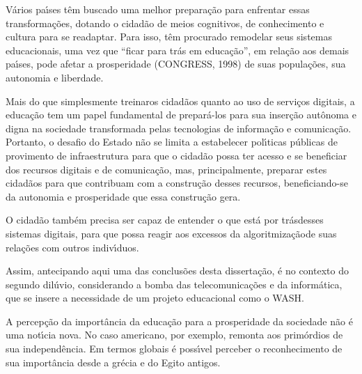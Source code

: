 \documentclass[
12pt,		%
openright,	%
twoside,  %
a4paper,			%
chapter=TITLE,		%
english,			%
french,				%
spanish,			%
brazil				%
]{USPSC-classe/USPSC}
\begin{document}
V\'arios pa\'{\i}ses t\^em buscado uma melhor prepara\c{c}\~ao para enfrentar essas transforma\c{c}\~oes, dotando o cidad\~ao de meios cognitivos, de conhecimento e cultura para se readaptar. Para isso, t\^em procurado remodelar seus sistemas educacionais, uma vez que “ficar para tr\'as em educa\c{c}\~ao”, em rela\c{c}\~ao aos demais pa\'{\i}ses, pode afetar a prosperidade (CONGRESS, 1998)  de suas popula\c{c}\~oes, sua autonomia e liberdade.




Mais do que simplesmente \textquotedbl treinar\textquotedbl  os cidad\~aos quanto ao uso  de servi\c{c}os digitais, a educa\c{c}\~ao tem um papel fundamental de prepar\'a-los para sua inser\c{c}\~ao aut\^onoma e digna na sociedade transformada pelas tecnologias de informa\c{c}\~ao e comunica\c{c}\~ao. Portanto, o desafio do Estado n\~ao se limita a estabelecer pol\'{\i}ticas p\'ublicas de provimento de infraestrutura para que o cidad\~ao possa ter acesso e se beneficiar dos recursos digitais e de comunica\c{c}\~ao, mas, principalmente, preparar estes cidad\~aos para que contribuam com a  constru\c{c}\~ao desses recursos, beneficiando-se da autonomia e prosperidade que  essa constru\c{c}\~ao gera.




O cidad\~ao tamb\'em precisa ser capaz de entender \textquotedbl o que est\'a por tr\'as\textquotedbl  desses sistemas digitais, para que possa reagir aos excessos da \textquotedbl algoritmiza\c{c}\~ao\textquotedbl  de suas rela\c{c}\~oes com outros indiv\'{\i}duos.




Assim, antecipando aqui uma das conclus\~oes desta disserta\c{c}\~ao, \'e no contexto do \textquotedbl segundo dil\'uvio\textquotedbl , considerando a bomba das telecomunica\c{c}\~oes e da inform\'atica, que se insere a necessidade de um projeto educacional como o WASH.




A percep\c{c}\~ao da import\^ancia da educa\c{c}\~ao para a prosperidade da sociedade n\~ao \'e uma not\'{\i}cia nova. No caso americano, por exemplo, remonta aos prim\'ordios de sua independ\^encia. Em termos globais \'e poss\'{\i}vel perceber o reconhecimento de sua import\^ancia desde a gr\'ecia e do Egito antigos.
\end{document}
